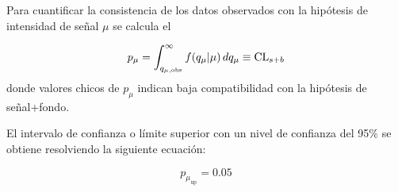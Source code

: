 




Para cuantificar la consistencia de los datos observados con la hipótesis de
intensidad de se\~nal $\mu$ se calcula el {\pvalue}

\begin{equation}
  p_\mu = \int_{q_{\mu,\text{obs}}}^{\infty} f(q_\mu|\mu) \, dq_\mu \equiv \text{CL}_{s+b}
  \label{eq:pmu}
\end{equation}
%
donde valores chicos de $p_\mu$ indican baja compatibilidad con la hipótesis
de señal+fondo.

El intervalo de confianza o límite superior con un nivel de
confianza del 95\% se obtiene resolviendo la siguiente ecuación:

\begin{equation}
  p_{\mu_\text{up}} = 0.05
\end{equation}

